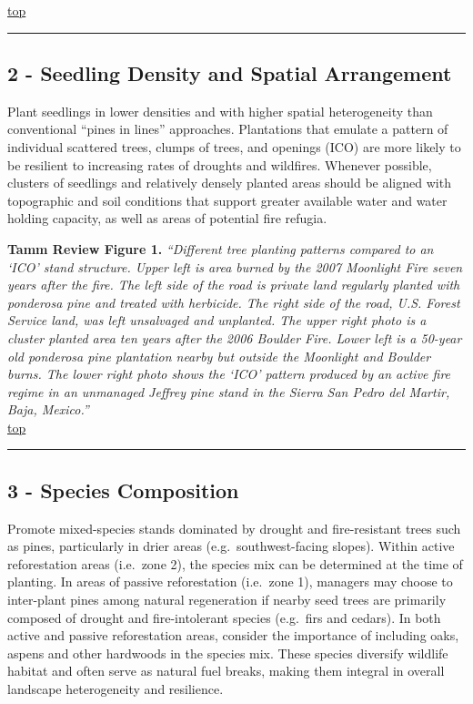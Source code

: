 \documentclass[]{article}
\begin{document}
\protect\hyperlink{top}{top}

\begin{center}\rule{0.5\linewidth}{\linethickness}\end{center}

\hypertarget{Link2}{\subsection{2 - Seedling Density and Spatial
Arrangement}\label{Link2}}

Plant seedlings in lower densities and with higher spatial heterogeneity
than conventional ``pines in lines'' approaches. Plantations that
emulate a pattern of individual scattered trees, clumps of trees, and
openings (ICO) are more likely to be resilient to increasing rates of
droughts and wildfires. Whenever possible, clusters of seedlings and
relatively densely planted areas should be aligned with topographic and
soil conditions that support greater available water and water holding
capacity, as well as areas of potential fire refugia.

 \textbf{Tamm Review Figure 1.} \emph{``Different tree planting patterns
compared to an `ICO' stand structure. Upper left is area burned by the
2007 Moonlight Fire seven years after the fire. The left side of the
road is private land regularly planted with ponderosa pine and treated
with herbicide. The right side of the road, U.S. Forest Service land,
was left unsalvaged and unplanted. The upper right photo is a cluster
planted area ten years after the 2006 Boulder Fire. Lower left is a
50-year old ponderosa pine plantation nearby but outside the Moonlight
and Boulder burns. The lower right photo shows the `ICO' pattern
produced by an active fire regime in an unmanaged Jeffrey pine stand in
the Sierra San Pedro del Martir, Baja, Mexico.''}\\

\protect\hyperlink{top}{top}

\begin{center}\rule{0.5\linewidth}{\linethickness}\end{center}

\hypertarget{Link3}{\subsection{3 - Species Composition}\label{Link3}}

Promote mixed-species stands dominated by drought and fire-resistant
trees such as pines, particularly in drier areas (e.g.~southwest-facing
slopes). Within active reforestation areas (i.e.~zone 2), the species
mix can be determined at the time of planting. In areas of passive
reforestation (i.e.~zone 1), managers may choose to inter-plant pines
among natural regeneration if nearby seed trees are primarily composed
of drought and fire-intolerant species (e.g.~firs and cedars). In both
active and passive reforestation areas, consider the importance of
including oaks, aspens and other hardwoods in the species mix. These
species diversify wildlife habitat and often serve as natural fuel
breaks, making them integral in overall landscape heterogeneity and
resilience.
\end{document}
